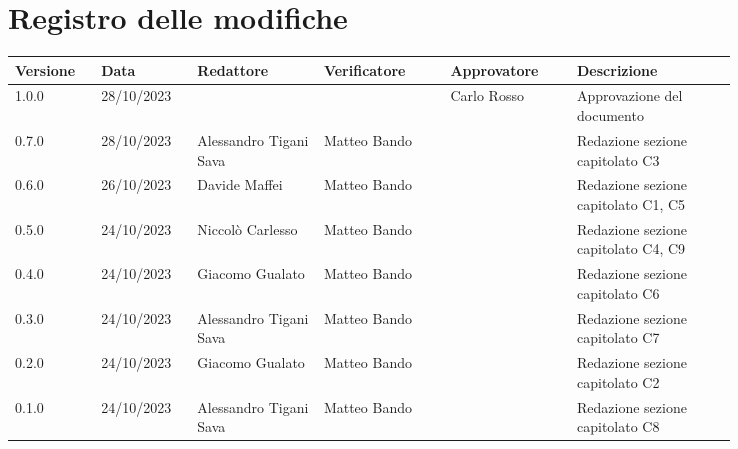 \section*{Registro delle modifiche}
{
\renewcommand{\arraystretch}{1.5}
\scriptsize
\begin{tabular}{p{0.10\linewidth}p{0.10\linewidth}p{0.15\linewidth}p{0.15\linewidth}p{0.15\linewidth}p{0.19\linewidth}}
    \textbf{Versione}   & \textbf{Data} & \textbf{Redattore}     & \textbf{Verificatore} & \textbf{Approvatore}  & \textbf{Descrizione}  \\
    \hline
    1.0.0   & 28/10/2023    &										  &	  & Carlo Rosso & Approvazione del documento   \\
    \hline
    0.7.0   & 28/10/2023    & Alessandro Tigani Sava & Matteo Bando	  &   & Redazione sezione capitolato C3   \\
    \hline
    0.6.0   & 26/10/2023    & Davide Maffei          & Matteo Bando   &   & Redazione sezione capitolato C1, C5   \\   
    \hline 
    0.5.0   & 24/10/2023    & Niccolò Carlesso       & Matteo Bando   &   & Redazione sezione capitolato C4, C9  	\\
    \hline
    0.4.0   & 24/10/2023    & Giacomo Gualato        & Matteo Bando   &   & Redazione sezione capitolato C6  	\\
    \hline
    0.3.0   & 24/10/2023    & Alessandro Tigani Sava & Matteo Bando   &   & Redazione sezione capitolato C7   \\
    \hline
    0.2.0   & 24/10/2023    & Giacomo Gualato        & Matteo Bando   &   & Redazione sezione capitolato C2   \\
    \hline
    0.1.0   & 24/10/2023    & Alessandro Tigani Sava & Matteo Bando	  &   & Redazione sezione capitolato C8   \\    
    \hline
\end{tabular}
}
